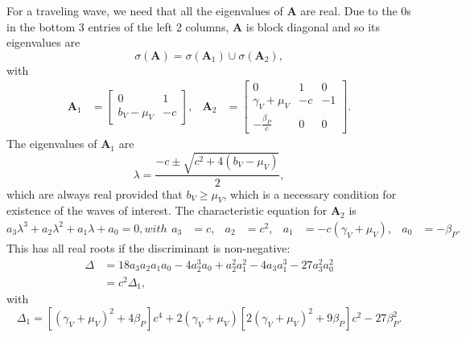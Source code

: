 \documentclass{article}
\newcommand{\mat}[1]{\mathbf{#1}}
\begin{document}
For a traveling wave, we need that all the eigenvalues of $\mat{A}$
are real.  Due to the $0$s in the bottom 3 entries of the left 2
columns, $\mat{A}$ is block diagonal and so its eigenvalues are
\begin{equation}
  \sigma(\mat{A}) = \sigma(\mat{A}_1) \cup \sigma(\mat{A}_2),
\end{equation}
with
\begin{align}
  \mat{A}_1 &=
  \begin{bmatrix}
    0 & 1 \\
    b_V - \mu_V & - c
  \end{bmatrix},
  &
  \mat{A}_2 &=
  \begin{bmatrix}
    0 & 1 & 0 \\
    \gamma_V + \mu_V & - c & - 1 \\
    - \frac{\beta_P}{c} & 0 & 0
  \end{bmatrix}.
\end{align}
The eigenvalues of $\mat{A}_1$ are
\begin{equation}
  \lambda = \frac{-c \pm \sqrt{c^2 + 4 (b_V - \mu_V)}}{2},
\end{equation}
which are always real provided that $b_V \geq \mu_V$, which is a
necessary condition for existence of the waves of interest.  The
characteristic equation for $\mat{A}_2$ is
\begin{subequations}
  \begin{equation}
    a_3 \lambda^3 + a_2 \lambda^2 +
    a_1 \lambda + a_0 = 0,
  \end{equation}
  with
  \begin{align}
    a_3 &= c, &
    a_2 &= c^2, &
    a_1 &= - c (\gamma_V + \mu_V), &
    a_0 &= - \beta_P.
  \end{align}
\end{subequations}
This has all real roots if the discriminant is non-negative:
\begin{equation}
  \begin{split}
    \Delta &=
    18 a_3 a_2 a_1 a_0
    - 4 a_2^3 a_0
    + a_2^2 a_1^2
    - 4 a_3 a_1^3
    - 27 a_3^2 a_0^2
    \\
    &= c^2 \Delta_1,
  \end{split}
\end{equation}
with
\begin{equation}
  \Delta_1
  =
  \left[(\gamma_V + \mu_V)^2 + 4 \beta_P\right] c^4
  + 2 (\gamma_V + \mu_V)
  \left[2 (\gamma_V + \mu_V)^2 + 9 \beta_P\right] c^2
  - 27 \beta_P^2.
\end{equation}
\end{document}
